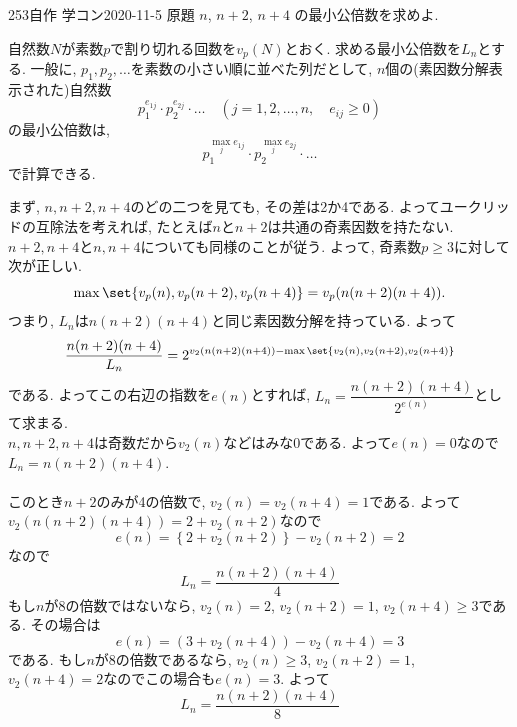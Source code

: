 \begin{prob}{253}{\maru}{自作 学コン2020-11-5 原題}
 $n$, $n+2$, $n+4$ の最小公倍数を求めよ.
\end{prob}
自然数$N$が素数$p$で割り切れる回数を$v_{p}(N)$とおく. 求める最小公倍数を$L_n$とする. 一般に, $p_1,p_2,\dots$を素数の小さい順に並べた列だとして, $n$個の(素因数分解表示された)自然数
\[
p_{1}^{e_{1j}}\cdot p_2^{e_{2j}} \cdot \dots \quad (j=1,2,\dots, n,\quad e_{ij} \geq 0)
\]
の最小公倍数は, 
\[p_1^{\max_{j} e_{1j}}\cdot p_2^{\max_{j} e_{2j}}\cdot \dots \]
で計算できる. \par 
まず, $n,n+2,n+4$のどの二つを見ても, その差は2か4である. よってユークリッドの互除法を考えれば, たとえば$n$と$n+2$は共通の奇素因数を持たない. $n+2,n+4$と$n,n+4$についても同様のことが従う. よって, 奇素数$p\geq 3$に対して次が正しい. 
\[\max{\set{v_{p}(n),v_{p}(n+2),v_{p}(n+4)}} = v_{p}(n(n+2)(n+4)).\]
つまり,  $L_n$は$n(n+2)(n+4)$と同じ素因数分解を持っている. よって
\[\dfrac{n(n+2)(n+4)}{L_n} = 2^{v_2(n(n+2)(n+4))- \max{\set{v_2(n), v_2(n+2), v_2(n+4)}}}\]
である. よってこの右辺の指数を$e(n)$とすれば, $L_n = \dfrac{n(n+2)(n+4)}{2^{e(n)}}$として求まる. \\
$n,n+2,n+4$は奇数だから$v_2(n)$などはみな0である. よって$e(n) = 0$なので$L_n=n(n+2)(n+4)$. \\
 \\
このとき$n+2$のみが4の倍数で, $v_2(n) = v_2(n+4) = 1$である. よって$v_2(n(n+2)(n+4)) = 2+v_2(n+2)$なので
\[e(n) = \left\{ 2+v_2(n+2)\right\} - v_2(n+2) = 2\]
なので
\[L_n = \dfrac{n(n+2)(n+4)}{4}\]
 もし$n$が8の倍数ではないなら, $v_2(n) = 2$, $v_2(n+2) = 1$, $v_2(n+4) \geq 3$である. その場合は
\[e(n) = (3+v_2(n+4)) - v_2(n+4) = 3 \]
である. もし$n$が8の倍数であるなら, $v_2(n)\geq 3$, $v_2(n+2) = 1$, $v_2(n+4) = 2$なのでこの場合も$e(n) = 3$. よって
\[L_n = \dfrac{n(n+2)(n+4)}{8}\]

